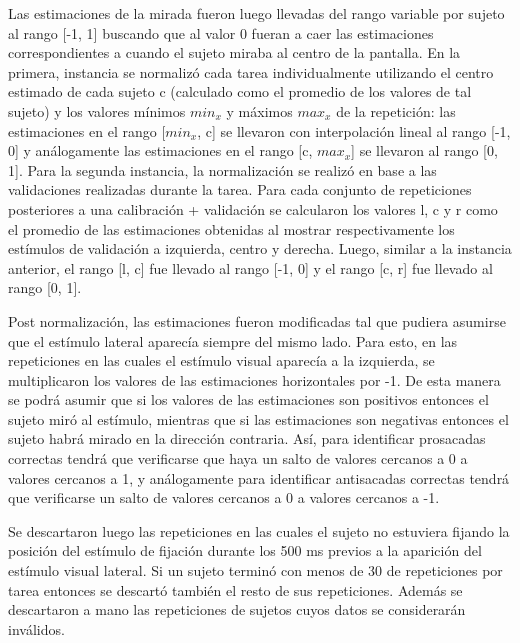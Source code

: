 Las estimaciones de la mirada fueron luego llevadas del rango variable por
sujeto al rango [-1, 1] buscando que al valor 0 fueran a caer las estimaciones
correspondientes a cuando el sujeto miraba al centro de la pantalla.
En la primera, instancia se normalizó cada tarea individualmente utilizando el
centro estimado de cada sujeto c (calculado como el promedio de los valores de
tal sujeto) y los valores mínimos $min_x$ y máximos $max_x$ de la repetición:
las estimaciones en el rango [$min_x$, c] se llevaron con interpolación lineal
al rango [-1, 0] y análogamente las estimaciones en el rango [c, $max_x$] se
llevaron al rango [0, 1].
Para la segunda instancia, la normalización se realizó en base a las
validaciones realizadas durante la tarea.
Para cada conjunto de repeticiones posteriores a una calibración + validación
se calcularon los valores l, c y r como el promedio de las estimaciones
obtenidas al mostrar respectivamente los estímulos de validación a izquierda,
centro y derecha.
Luego, similar a la instancia anterior, el rango [l, c] fue llevado al rango
[-1, 0] y el rango [c, r] fue llevado al rango [0, 1].

Post normalización, las estimaciones fueron modificadas tal que pudiera
asumirse que el estímulo lateral aparecía siempre del mismo lado.
Para esto, en las repeticiones en las cuales el estímulo visual aparecía a la
izquierda, se multiplicaron los valores de las estimaciones horizontales por
-1.
De esta manera se podrá asumir que si los valores de las estimaciones son
positivos entonces el sujeto miró al estímulo, mientras que si las estimaciones
son negativas entonces el sujeto habrá mirado en la dirección contraria.
Así, para identificar prosacadas correctas tendrá que verificarse que haya un
salto de valores cercanos a 0 a valores cercanos a 1, y análogamente para
identificar antisacadas correctas tendrá que verificarse un salto de valores
cercanos a 0 a valores cercanos a -1.

Se descartaron luego las repeticiones en las cuales el sujeto no estuviera
fijando la posición del estímulo de fijación durante los 500 ms previos a la
aparición del estímulo visual lateral.
Si un sujeto terminó con menos de 30 de repeticiones por tarea entonces se
descartó también el resto de sus repeticiones.
Además se descartaron a mano las repeticiones de sujetos cuyos datos se
considerarán inválidos.
